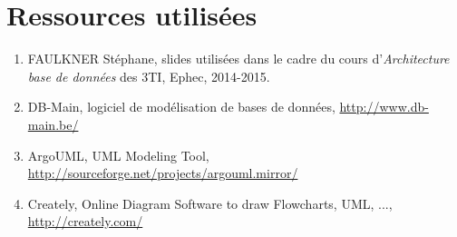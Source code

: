 \newpage
\section*{Ressources utilisées}
\begin{enumerate}
\item FAULKNER Stéphane, slides utilisées dans le cadre du cours d'\textit{Architecture base de données} des 3TI, Ephec, 2014-2015.
\item DB-Main, logiciel de modélisation de bases de données, \url{http://www.db-main.be/}
\item ArgoUML, UML Modeling Tool, \url{http://sourceforge.net/projects/argouml.mirror/}
\item Creately,  Online Diagram Software to draw Flowcharts, UML, ..., \url{http://creately.com/}
\end{enumerate}